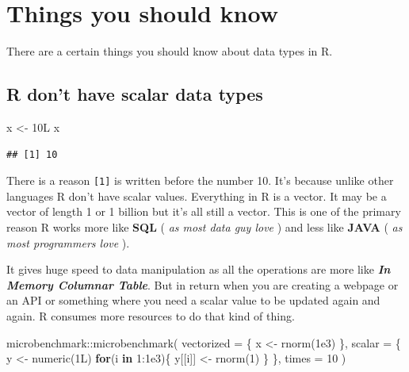 \documentclass[
]{book}
\newenvironment{Shaded}{\begin{snugshade}}{\end{snugshade}}
\newcommand{\AttributeTok}[1]{\textcolor[rgb]{0.77,0.63,0.00}{#1}}
\newcommand{\ControlFlowTok}[1]{\textcolor[rgb]{0.13,0.29,0.53}{\textbf{#1}}}
\newcommand{\DecValTok}[1]{\textcolor[rgb]{0.00,0.00,0.81}{#1}}
\newcommand{\FloatTok}[1]{\textcolor[rgb]{0.00,0.00,0.81}{#1}}
\newcommand{\FunctionTok}[1]{\textcolor[rgb]{0.00,0.00,0.00}{#1}}
\newcommand{\NormalTok}[1]{#1}
\newcommand{\OtherTok}[1]{\textcolor[rgb]{0.56,0.35,0.01}{#1}}
\newcommand{\SpecialCharTok}[1]{\textcolor[rgb]{0.00,0.00,0.00}{#1}}
\begin{document}
\hypertarget{things-you-should-know}{%
\section{Things you should know}\label{things-you-should-know}}

There are a certain things you should know about data types in R.

\hypertarget{r-dont-have-scalar-data-types}{%
\subsection{R don't have scalar data types}\label{r-dont-have-scalar-data-types}}

\begin{Shaded}
\begin{Highlighting}[]
\NormalTok{x }\OtherTok{\textless{}{-}}\NormalTok{ 10L}
\NormalTok{x}
\end{Highlighting}
\end{Shaded}

\begin{verbatim}
## [1] 10
\end{verbatim}

There is a reason \texttt{{[}1{]}} is written before the number 10. It's because unlike other languages R don't have scalar values. Everything in R is a vector. It may be a vector of length 1 or 1 billion but it's all still a vector. This is one of the primary reason R works more like \textbf{SQL} ( \emph{as most data guy love} ) and less like \textbf{JAVA} ( \emph{as most programmers love} ).

It gives huge speed to data manipulation as all the operations are more like \textbf{\emph{In Memory Columnar Table}}. But in return when you are creating a webpage or an API or something where you need a scalar value to be updated again and again. R consumes more resources to do that kind of thing.

\begin{Shaded}
\begin{Highlighting}[]
\NormalTok{microbenchmark}\SpecialCharTok{::}\FunctionTok{microbenchmark}\NormalTok{(}
\AttributeTok{vectorized =}\NormalTok{ \{}
\NormalTok{  x }\OtherTok{\textless{}{-}} \FunctionTok{rnorm}\NormalTok{(}\FloatTok{1e3}\NormalTok{)}
\NormalTok{\},}
\AttributeTok{scalar =}\NormalTok{ \{}
\NormalTok{  y }\OtherTok{\textless{}{-}} \FunctionTok{numeric}\NormalTok{(1L)}
  \ControlFlowTok{for}\NormalTok{(i }\ControlFlowTok{in} \DecValTok{1}\SpecialCharTok{:}\FloatTok{1e3}\NormalTok{)\{}
\NormalTok{  y[[i]] }\OtherTok{\textless{}{-}} \FunctionTok{rnorm}\NormalTok{(}\DecValTok{1}\NormalTok{)}
\NormalTok{  \}}
\NormalTok{\},}
\AttributeTok{times =} \DecValTok{10}
\NormalTok{)}
\end{Highlighting}
\end{Shaded}
\end{document}

